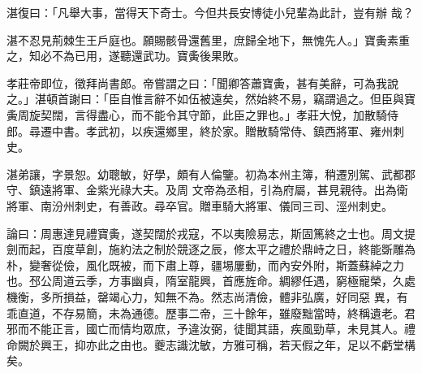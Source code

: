 \begin{pinyinscope}
 湛復曰：「凡舉大事，當得天下奇士。今但共長安博徒小兒輩為此計，豈有辦
 哉？



 湛不忍見荊棘生王戶庭也。願賜骸骨還舊里，庶歸全地下，無愧先人。」寶夤素重之，知必不為已用，遂聽還武功。寶夤後果敗。



 孝莊帝即位，徵拜尚書郎。帝嘗謂之曰：「聞卿答蕭寶夤，甚有美辭，可為我說之。」湛頓首謝曰：「臣自惟言辭不如伍被遠矣，然始終不易，竊謂過之。但臣與寶夤周旋契闊，言得盡心，而不能令其守節，此臣之罪也。」孝莊大悅，加散騎侍郎。尋遷中書。孝武初，以疾還鄉里，終於家。贈散騎常侍、鎮西將軍、雍州刺史。



 湛弟讓，字景恕。幼聰敏，好學，頗有人倫鑒。初為本州主簿，稍遷別駕、武都郡守、鎮遠將軍、金紫光祿大夫。及周
 文帝為丞相，引為府屬，甚見親待。出為衛將軍、南汾州刺史，有善政。尋卒官。贈車騎大將軍、儀同三司、涇州刺史。



 論曰：周惠達見禮寶夤，遂契闊於戎寇，不以夷險易志，斯固篤終之士也。周文提劍而起，百度草創，施約法之制於競逐之辰，修太平之禮於鼎峙之日，終能斲雕為朴，變奢從儉，風化既被，而下肅上尊，疆埸屢動，而內安外附，斯蓋蘇綽之力也。邳公周道云季，方事幽貞，隋室龍興，首應旌命。綢繆任遇，窮極寵榮，久處機衡，多所損益，罄竭心力，知無不為。然志尚清儉，體非弘廣，好同惡
 異，有乖直道，不存易簡，未為通德。歷事二帝，三十餘年，雖廢黜當時，終稱遺老。君邪而不能正言，國亡而情均眾庶，予違汝弼，徒聞其語，疾風勁草，未見其人。禮命闕於興王，抑亦此之由也。夔志識沈敏，方雅可稱，若天假之年，足以不虧堂構矣。



\end{pinyinscope}